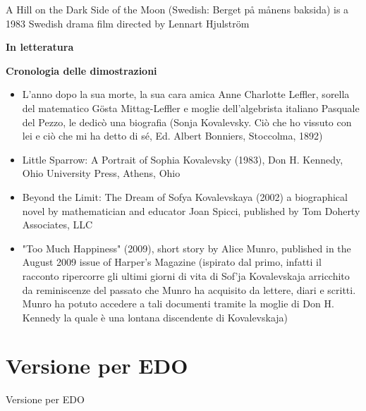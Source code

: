 A Hill on the Dark Side of the Moon (Swedish: Berget på månens baksida) is a 1983 Swedish drama film directed by Lennart Hjulström

\textbf{In letteratura}

\textbf{Cronologia delle dimostrazioni}
\begin{itemize}
\item
L'anno dopo la sua morte, la sua cara amica Anne Charlotte Leffler, sorella del matematico Gösta Mittag-Leffler e moglie dell'algebrista italiano Pasquale del Pezzo, le dedicò una biografia (Sonja Kovalevsky. Ciò che ho vissuto con lei e ciò che mi ha detto di sé, Ed. Albert Bonniers, Stoccolma, 1892)
\item 
Little Sparrow: A Portrait of Sophia Kovalevsky (1983), Don H. Kennedy, Ohio University Press, Athens, Ohio
\item
Beyond the Limit: The Dream of Sofya Kovalevskaya (2002) a biographical novel by mathematician and educator Joan Spicci, published by Tom Doherty Associates, LLC
\item
"Too Much Happiness" (2009), short story by Alice Munro, published in the August 2009 issue of Harper's Magazine (ispirato dal primo, infatti il racconto ripercorre gli ultimi giorni di vita di Sof'ja Kovalevskaja arricchito da reminiscenze del passato che Munro ha acquisito da lettere, diari e scritti. Munro ha potuto accedere a tali documenti tramite la moglie di Don H. Kennedy la quale è una lontana discendente di Kovalevskaja)
\end{itemize}

\section{Versione per EDO}
Versione per EDO
